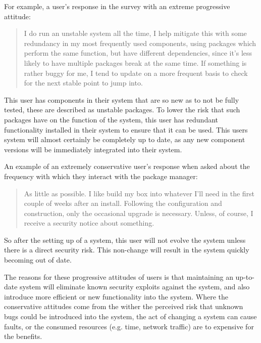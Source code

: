 For example, a user's response in the survey with an extreme progressive attitude:
\begin{quotation}
I do run an unstable system all the time, I help mitigate this with some redundancy in my most frequently used components, 
using packages which perform the same function, but have different dependencies, since it's less likely to have multiple packages break at the same time. 
If something is rather buggy for me, I tend to update on a more frequent basis to check for the next stable point to jump into.
\end{quotation}
This user has components in their system that are so new as to not be fully tested, these are described as unstable packages.
To lower the risk that such packages have on the function of the system, this user has redundant functionality installed in their system to ensure that it can be used.
This users system will almost certainly be completely up to date, as any new component versions will be immediately integrated into their system.

An example of an extremely conservative user's response when asked about the frequency with which they interact with the package manager:
\begin{quotation}
As little as possible. I like build my box into whatever I'll need in the first couple of weeks after an install. 
Following the configuration and construction, only the occasional upgrade is necessary. 
Unless, of course, I receive a security notice about something.
\end{quotation}
So after the setting up of a system, this user will not evolve the system unless there is a direct security risk.
This non-change will result in the system quickly becoming out of date.

The reasons for these progressive attitudes of users is that maintaining an up-to-date system will eliminate known security exploits against the system,
and also introduce more efficient or new functionality into the system.
Where the conservative attitudes come from the wither the perceived risk that unknown bugs could be introduced into the system, the act of changing a system can cause faults,
or the consumed resources (e.g. time, network traffic) are to expensive for the benefits.

